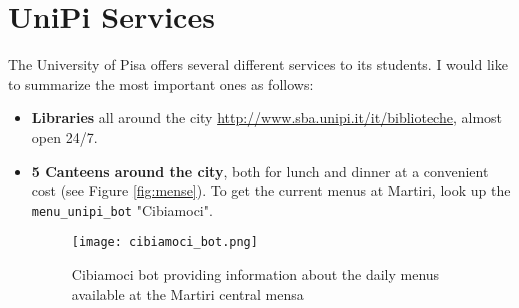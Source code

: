 \documentclass[11pt,fleqn,oneside]{book} %
\begin{document}
\section{UniPi Services}
The University of Pisa offers several different services to its students. I would like to summarize the most important ones as follows:
\begin{itemize}
\item \textbf{Libraries} all around the city \url{http://www.sba.unipi.it/it/biblioteche}, almost open 24/7. 
\item \textbf{5 Canteens around the city}, both for lunch and dinner at a convenient cost (see Figure \ref{fig:mense}). To get the current menus at Martiri, look up the \texttt{menu\_unipi\_bot} "Cibiamoci". 

\begin{figure}[h]
  \centering\texttt{[image: cibiamoci\_bot.png]}
  \caption{Cibiamoci bot providing information about the daily menus available at the Martiri central mensa}
\end{figure}



\end{itemize}
\end{document}
